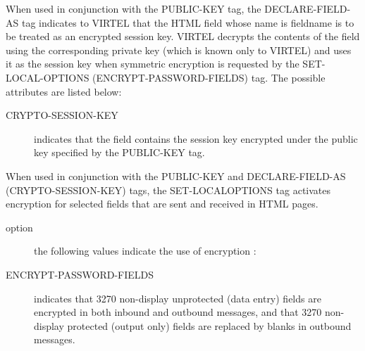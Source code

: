 \documentclass[letterpaper,10pt,english]{sphinxmanual}
\begin{document}
\label{\detokenize{User_Guide:v457ug-declare-field-crypto}}
\def\sphinxLiteralBlockLabel{\label{\detokenize{User_Guide:v457ug-declare-field-crypto}}}
\begin{sphinxVerbatim}[commandchars=\\\{\}]
  
\end{sphinxVerbatim}
\let\sphinxLiteralBlockLabel\empty

When used in conjunction with the PUBLIC-KEY tag, the DECLARE-FIELD-AS tag indicates to VIRTEL that the HTML field
whose name is fieldname is to be treated as an encrypted session key. VIRTEL decrypts the contents of the field using
the corresponding private key (which is known only to VIRTEL) and uses it as the session key when symmetric
encryption is requested by the SET-LOCAL-OPTIONS (ENCRYPT-PASSWORD-FIELDS) tag. The possible attributes are
listed below:
\begin{description}
\item[{CRYPTO-SESSION-KEY}] \leavevmode
indicates that the field contains the session key encrypted under the public key specified by the PUBLIC-KEY tag.

\end{description}


When used in conjunction with the PUBLIC-KEY and DECLARE-FIELD-AS (CRYPTO-SESSION-KEY) tags, the SET-LOCALOPTIONS
tag activates encryption for selected fields that are sent and received in HTML pages.

\begin{sphinxVerbatim}[commandchars=\\\{\}]
     
\end{sphinxVerbatim}
\begin{description}
\item[{option}] \leavevmode
the following values indicate the use of encryption :

\item[{ENCRYPT-PASSWORD-FIELDS}] \leavevmode
indicates that 3270 non-display unprotected (data entry) fields are encrypted in both inbound and outbound messages, and that 3270 non-display protected (output only) fields are replaced by blanks in outbound messages.

\end{description}
\end{document}
